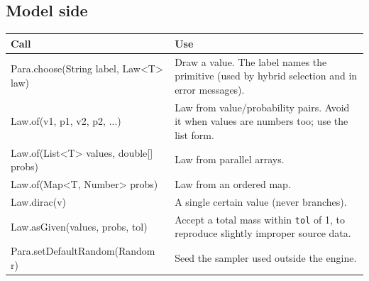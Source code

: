 \documentclass[11pt]{article}
\newcommand{\code}[1]{\texttt{#1}}
\begin{document}
\subsection{Model side}
\begin{center}
\begin{tabularx}{\linewidth}{@{}>{\ttfamily\small}p{6.6cm} Y@{}}
\toprule
\normalfont\textbf{Call} & \textbf{Use}\\
\midrule
Para.choose(String label, Law<T> law) & Draw a value. The label names the primitive (used by hybrid selection and in error messages).\\
Law.of(v1, p1, v2, p2, ...) & Law from value/probability pairs. Avoid it when values are numbers too; use the list form.\\
Law.of(List<T> values, double[] probs) & Law from parallel arrays.\\
Law.of(Map<T, Number> probs) & Law from an ordered map.\\
Law.dirac(v) & A single certain value (never branches).\\
Law.asGiven(values, probs, tol) & Accept a total mass within \code{tol} of 1, to reproduce slightly improper source data.\\
Para.setDefaultRandom(Random r) & Seed the sampler used outside the engine.\\
\bottomrule
\end{tabularx}
\end{center}
\end{document}
